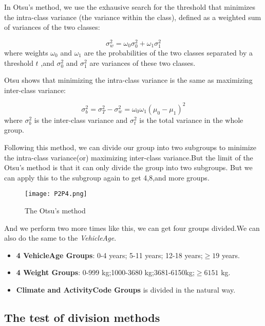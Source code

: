 \documentclass[11pt]{article}
\begin{document}
In Otsu's method, we use the exhausive search for the threshold that minimizes the intra-class variance (the variance within the class), defined as a weighted sum of variances of the two classes:

\begin{equation}
	\sigma_w^2=\omega_0\sigma_0^2+\omega_1\sigma^2_1
\end{equation}
where weights $\omega_{0}$ and  $\omega_{1}$ are the probabilities of the two classes separated by a threshold $t$ ,and   $\sigma _{0}^{2}$ and  $\sigma _{1}^{2}$ are variances of these two classes.

Otsu shows that minimizing the intra-class variance is the same as maximizing inter-class variance:

\begin{equation}
	\sigma_b^2=\sigma_T^2-\sigma_w^2=\omega_0\omega_1(\mu_0-\mu_1)^2
\end{equation}
where $\sigma_b^2$ is the inter-class variance and $\sigma_t^2$ is the total variance in the whole group.

Following this method, we can divide our group into two subgroups to minimize the intra-class variance(or) maximizing inter-class variance.But the limit of the Otsu's method is that it can only divide the group into two subgroups. But we can apply this to the subgroup again to get 4,8,and more groups.

\begin{figure}[!htb]
\centering
\texttt{[image: P2P4.png]}
\caption{The Otsu's method}\label{Fig4}
\end{figure}

And we perform two more times like this, we can get four groups divided.We can also do the same to the {\it VehicleAge}.

\begin{itemize}
	\item {\bf 4 VehicleAge Groups}: 0-4 years; 5-11 years; 12-18 years;$\geqslant 19$ years.
	\item {\bf 4 Weight Groups}: 0-999 kg;1000-3680 kg;3681-6150kg;$\geqslant 6151$ kg.
	\item {\bf Climate and ActivityCode Groups} is divided in the natural way. 
\end{itemize}


\subsection{The test of division methods}
\end{document}
